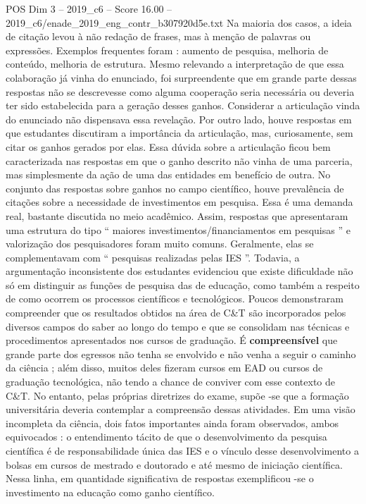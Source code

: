 \begin{textsample}{POS Dim 3 – 2019\_c6 – Score 16.00 – 2019\_c6/enade\_2019\_eng\_contr\_b307920d5e.txt}
Na maioria dos casos, a ideia de citação levou à não redação de frases, mas à menção de palavras ou expressões.
Exemplos frequentes foram : aumento de pesquisa, melhoria de conteúdo, melhoria de estrutura.
Mesmo relevando a interpretação de que essa colaboração já vinha do enunciado, foi surpreendente que em grande parte dessas respostas não se descrevesse como alguma cooperação seria necessária ou deveria ter sido estabelecida para a geração desses ganhos.
Considerar a articulação vinda do enunciado não dispensava essa revelação.
Por outro lado, houve respostas em que estudantes discutiram a importância da articulação, mas, curiosamente, sem citar os ganhos gerados por elas.
Essa dúvida sobre a articulação ficou bem caracterizada nas respostas em que o ganho descrito não vinha de uma parceria, mas simplesmente da ação de uma das entidades em benefício de outra.
No conjunto das respostas sobre ganhos no campo científico, houve prevalência de citações sobre a necessidade de investimentos em pesquisa.
Essa é uma demanda real, bastante discutida no meio acadêmico.
Assim, respostas que apresentaram uma estrutura do tipo “ maiores investimentos/financiamentos em pesquisas ” e valorização dos pesquisadores foram muito comuns.
Geralmente, elas se complementavam com “ pesquisas realizadas pelas IES ”.
Todavia, a argumentação inconsistente dos estudantes evidenciou que existe dificuldade não só em distinguir as funções de pesquisa das de educação, como também a respeito de como ocorrem os processos científicos e tecnológicos.
Poucos demonstraram compreender que os resultados obtidos na área de C\&T são incorporados pelos diversos campos do saber ao longo do tempo e que se consolidam nas técnicas e procedimentos apresentados nos cursos de graduação.
É \textbf{compreensível} que grande parte dos egressos não tenha se envolvido e não venha a seguir o caminho da ciência ; além disso, muitos deles fizeram cursos em EAD ou cursos de graduação tecnológica, não tendo a chance de conviver com esse contexto de C\&T.
No entanto, pelas próprias diretrizes do exame, supõe -se que a formação universitária deveria contemplar a compreensão dessas atividades.
Em uma visão incompleta da ciência, dois fatos importantes ainda foram observados, ambos equivocados : o entendimento tácito de que o desenvolvimento da pesquisa científica é de responsabilidade única das IES e o vínculo desse desenvolvimento a bolsas em cursos de mestrado e doutorado e até mesmo de iniciação científica.
Nessa linha, em quantidade significativa de respostas exemplificou -se o investimento na educação como ganho científico.

\end{textsample}
